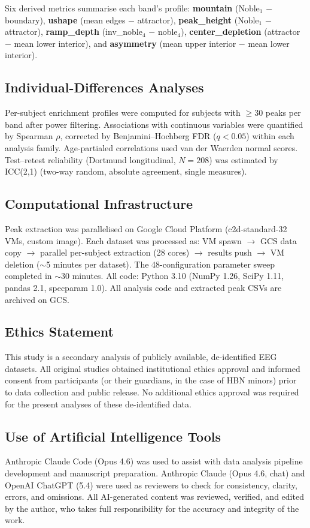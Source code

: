 Six derived metrics summarise each band's profile: \textbf{mountain} (Noble$_1$ $-$ boundary), \textbf{ushape} (mean edges $-$ attractor), \textbf{peak\_height} (Noble$_1$ $-$ attractor), \textbf{ramp\_depth} (inv\_noble$_4$ $-$ noble$_4$), \textbf{center\_depletion} (attractor $-$ mean lower interior), and \textbf{asymmetry} (mean upper interior $-$ mean lower interior).

\subsection{Individual-Differences Analyses}
\label{sec:individual_diffs}

Per-subject enrichment profiles were computed for subjects with $\geq 30$ peaks per band after power filtering. Associations with continuous variables were quantified by Spearman $\rho$, corrected by Benjamini--Hochberg FDR ($q < 0.05$) within each analysis family. Age-partialed correlations used van der Waerden normal scores. Test--retest reliability (Dortmund longitudinal, $N = 208$) was estimated by ICC(2,1) (two-way random, absolute agreement, single measures).

\subsection{Computational Infrastructure}
\label{sec:infrastructure}

Peak extraction was parallelised on Google Cloud Platform (c2d-standard-32 VMs, custom image). Each dataset was processed as: VM spawn $\to$ GCS data copy $\to$ parallel per-subject extraction (28 cores) $\to$ results push $\to$ VM deletion ($\sim$5 minutes per dataset). The 48-configuration parameter sweep completed in $\sim$30 minutes. All code: Python 3.10 (NumPy 1.26, SciPy 1.11, pandas 2.1, specparam 1.0). All analysis code and extracted peak CSVs are archived on GCS.

\subsection{Ethics Statement}
\label{sec:ethics}

This study is a secondary analysis of publicly available, de-identified EEG datasets. All original studies obtained institutional ethics approval and informed consent from participants (or their guardians, in the case of HBN minors) prior to data collection and public release. No additional ethics approval was required for the present analyses of these de-identified data.

\subsection{Use of Artificial Intelligence Tools}
\label{sec:ai_disclosure}

Anthropic Claude Code (Opus 4.6) was used to assist with data analysis pipeline development and manuscript preparation. Anthropic Claude (Opus 4.6, chat) and OpenAI ChatGPT (5.4) were used as reviewers to check for consistency, clarity, errors, and omissions. All AI-generated content was reviewed, verified, and edited by the author, who takes full responsibility for the accuracy and integrity of the work.

